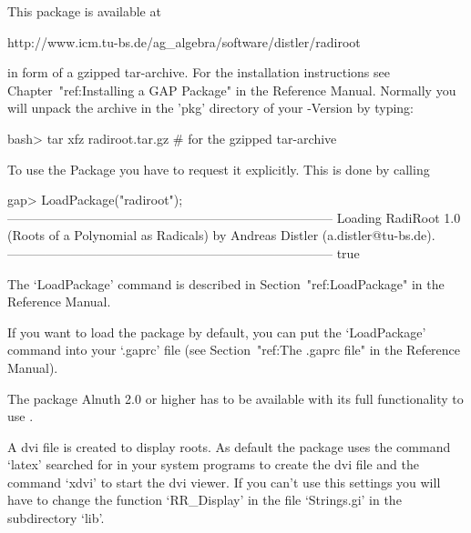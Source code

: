 


This package is available at

\begintt
http://www.icm.tu-bs.de/ag_algebra/software/distler/radiroot
\endtt

in form of a gzipped tar-archive. For the installation instructions see
Chapter~"ref:Installing a GAP Package" in the {\GAP} Reference Manual. 
Normally you will unpack the archive in the 'pkg' directory of your
{\GAP}-Version by typing:

\beginexample
    bash> tar xfz radiroot.tar.gz        # for the gzipped tar-archive
\endexample


To use the {\Radiroot} Package you have to request it explicitly. This  is
done by calling

\beginexample
gap> LoadPackage("radiroot");
-----------------------------------------------------------------------------
Loading  RadiRoot 1.0 (Roots of a Polynomial as Radicals)
by Andreas Distler (a.distler@tu-bs.de).
-----------------------------------------------------------------------------
true
\endexample

The `LoadPackage' command is described  in  Section~"ref:LoadPackage"  in
the {\GAP} Reference Manual.

If you want to load the {\Radiroot} package by default, you  can  put  the
`LoadPackage' command  into  your  `.gaprc'  file  (see  Section~"ref:The
.gaprc file" in the {\GAP} Reference Manual).


The package Alnuth 2.0 or higher has to be available with its full
functionality to use {\Radiroot}.

A dvi file is created to display roots. As default the package uses the
command `latex' searched for in your system programs to create the dvi file
and the command `xdvi' to start the dvi viewer. If you can't use this
settings you will have to change the function `RR_Display' in the file
`Strings.gi' in the subdirectory `lib'.

